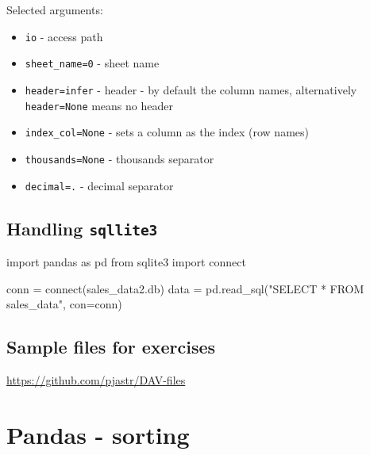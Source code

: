 \documentclass[
  english,
  letterpaper,
  DIV=11,
  numbers=noendperiod]{scrreprt}
\newenvironment{Shaded}{\begin{snugshade}}{\end{snugshade}}
\newcommand{\ExtensionTok}[1]{\textcolor[rgb]{0.00,0.23,0.31}{#1}}
\newcommand{\ImportTok}[1]{\textcolor[rgb]{0.00,0.46,0.62}{#1}}
\newcommand{\NormalTok}[1]{\textcolor[rgb]{0.00,0.23,0.31}{#1}}
\newcommand{\OperatorTok}[1]{\textcolor[rgb]{0.37,0.37,0.37}{#1}}
\newcommand{\StringTok}[1]{\textcolor[rgb]{0.13,0.47,0.30}{#1}}
\providecommand{\tightlist}{%
  \setlength{\itemsep}{0pt}\setlength{\parskip}{0pt}}
\begin{document}
Selected arguments:

\begin{itemize}
\tightlist
\item
  \texttt{io} - access path
\item
  \texttt{sheet\_name=0} - sheet name
\item
  \texttt{header=\textquotesingle{}infer\textquotesingle{}} - header -
  by default the column names, alternatively \texttt{header=None} means
  no header
\item
  \texttt{index\_col=None} - sets a column as the index (row names)
\item
  \texttt{thousands=None} - thousands separator
\item
  \texttt{decimal=\textquotesingle{}.\textquotesingle{}} - decimal
  separator
\end{itemize}

\section{\texorpdfstring{Handling
\texttt{sqllite3}}{Handling sqllite3}}\label{handling-sqllite3}

\begin{Shaded}
\begin{Highlighting}[]
\ImportTok{import}\NormalTok{ pandas }\ImportTok{as}\NormalTok{ pd}
\ImportTok{from}\NormalTok{ sqlite3 }\ImportTok{import} \ExtensionTok{connect}

\NormalTok{conn }\OperatorTok{=} \ExtensionTok{connect}\NormalTok{(}\StringTok{\textquotesingle{}sales\_data2.db\textquotesingle{}}\NormalTok{)}
\NormalTok{data }\OperatorTok{=}\NormalTok{ pd.read\_sql(}\StringTok{"SELECT * FROM sales\_data"}\NormalTok{, con}\OperatorTok{=}\NormalTok{conn)}
\end{Highlighting}
\end{Shaded}

\section{Sample files for exercises}\label{sample-files-for-exercises}

\url{https://github.com/pjastr/DAV-files}

\chapter{Pandas - sorting}\label{pandas---sorting}
\end{document}
